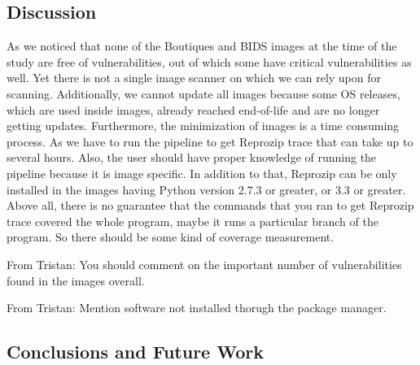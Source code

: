 \documentclass[a4paper,num-refs]{oup-contemporary}
\newcommand{\tristan}[1]{\color{blue}From Tristan: #1\color{black}}
\begin{document}
\subsection{Discussion}

As we noticed that none of the Boutiques and BIDS images at the time of the study are free of vulnerabilities, out of which
some have critical vulnerabilities as well. Yet there is not a single image scanner on which we can rely upon for
scanning. Additionally, we cannot update all images because some OS releases, which are used inside images, 
already reached end-of-life and are
no longer getting updates. Furthermore, the minimization of images is a time consuming process. As we have to run
the pipeline to get Reprozip trace that can take up to several hours. Also, the user should have proper knowledge
of running the pipeline because it is image specific. In addition to that, Reprozip can be only installed
in the images having Python version 2.7.3 or greater, or 3.3 or greater. Above all, there is no guarantee that
the commands that you ran to get Reprozip trace covered the whole program, maybe it runs a particular
branch of the program. So there should be some kind of coverage measurement.

\tristan{You should comment on the important number of vulnerabilities found in the images overall.}

\tristan{Mention software not installed thorugh the package manager.}

\subsection{Conclusions and Future Work}
\end{document}
